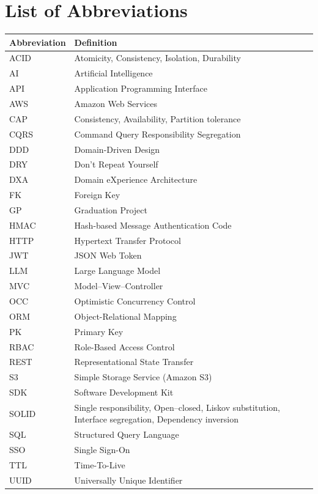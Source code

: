 
\chapter*{List of Abbreviations}

\begin{longtable}{@{}p{3.2cm} p{10.5cm}@{}}
\textbf{Abbreviation} & \textbf{Definition} \\[0.3cm]
\endhead

ACID & Atomicity, Consistency, Isolation, Durability \\
AI & Artificial Intelligence \\
API & Application Programming Interface \\
AWS & Amazon Web Services \\
CAP & Consistency, Availability, Partition tolerance \\
CQRS & Command Query Responsibility Segregation \\
DDD & Domain-Driven Design \\
DRY & Don't Repeat Yourself \\
DXA & Domain eXperience Architecture \\
FK & Foreign Key \\
GP & Graduation Project \\
HMAC & Hash-based Message Authentication Code \\
HTTP & Hypertext Transfer Protocol \\
JWT & JSON Web Token \\
LLM & Large Language Model \\
MVC & Model--View--Controller \\
OCC & Optimistic Concurrency Control \\
ORM & Object-Relational Mapping \\
PK & Primary Key \\
RBAC & Role-Based Access Control \\
REST & Representational State Transfer \\
S3 & Simple Storage Service (Amazon S3) \\
SDK & Software Development Kit \\
SOLID & Single responsibility, Open--closed, Liskov substitution, Interface segregation, Dependency inversion \\
SQL & Structured Query Language \\
SSO & Single Sign-On \\
TTL & Time-To-Live \\
UUID & Universally Unique Identifier \\

\end{longtable}

\clearpage
